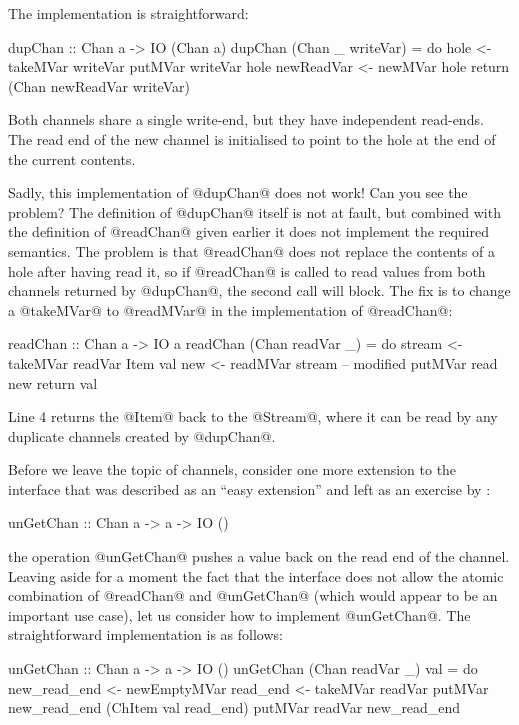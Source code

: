 The implementation is straightforward:

\begin{haskell}
dupChan :: Chan a -> IO (Chan a)
dupChan (Chan _ writeVar) = do
   hole       <- takeMVar writeVar
   putMVar writeVar hole
   newReadVar <- newMVar hole
   return (Chan newReadVar writeVar)
\end{haskell}

\noindent Both channels share a single write-end, but they have
independent read-ends.  The read end of the new channel is initialised
to point to the hole at the end of the current contents.

Sadly, this implementation of @dupChan@ does not work!  Can you see
the problem?  The definition of @dupChan@ itself is not at fault, but
combined with the definition of @readChan@ given earlier it does not
implement the required semantics.  The problem is that @readChan@ does
not replace the contents of a hole after having read it, so if
@readChan@ is called to read values from both channels returned by
@dupChan@, the second call will block.  The fix is to change a
@takeMVar@ to @readMVar@ in the implementation of @readChan@:

\begin{numhaskell}
readChan :: Chan a -> IO a
readChan (Chan readVar _) = do
  stream <- takeMVar readVar
  Item val new <- readMVar stream -- modified
  putMVar read new
  return val
\end{numhaskell}

\noindent Line 4 returns the @Item@ back to the @Stream@, where it can
be read by any duplicate channels created by @dupChan@.

Before we leave the topic of channels, consider one more extension to
the interface that was described as an ``easy extension'' and left as
an exercise by \citet{jones96concurrent}:

\begin{haskell}
unGetChan :: Chan a -> a -> IO ()
\end{haskell}

\noindent the operation @unGetChan@ pushes a value back on the read
end of the channel.  Leaving aside for a moment the fact that the
interface does not allow the atomic combination of @readChan@ and
@unGetChan@ (which would appear to be an important use case), let us
consider how to implement @unGetChan@.  The straightforward
implementation is as follows:

\begin{numhaskell}
unGetChan :: Chan a -> a -> IO ()
unGetChan (Chan readVar _) val = do
   new_read_end <- newEmptyMVar
   read_end <- takeMVar readVar
   putMVar new_read_end (ChItem val read_end)
   putMVar readVar new_read_end
\end{numhaskell}

